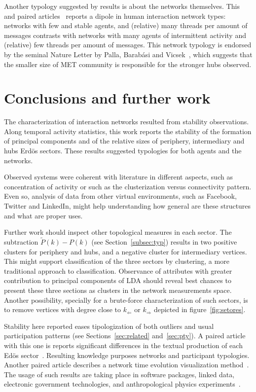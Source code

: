 \documentclass[%
 aip,
 jmp,%
 amsmath,amssymb,
 reprint,%
]{revtex4-1}
\begin{document}
Another typology suggested by results is about the networks themselves. This and paired articles~\cite{rcText,versinus} reports a dipole in human interaction network types: networks with few and stable agents, and (relative) many threads per amount of messages contrasts with networks with many agents of intermittent activity and (relative) few threads per amount of messages.
This network typology is endorsed by the seminal Nature Letter by Palla, Barab{\'a}si and Vicsek~\cite{barabasiEvo}, which suggests that the smaller size of MET community is responsible for the stronger hubs observed.

 
\section{Conclusions and further work}\label{sec:conc}
The characterization of interaction networks resulted from stability observations. Along temporal activity statistics, this work reports the stability of the formation of principal components and of the relative sizes of periphery, intermediary and hubs Erd\"os sectors. These results suggested typologies for both agents and the networks.

Observed systems were coherent with literature in different aspects, such as concentration of activity or such as the clusterization versus connectivity pattern.
Even so, analysis of data from other virtual environments, such as Facebook, Twitter and LinkedIn, might help understanding how general are these structures and what are proper uses.

Further work should inspect other topological measures in each sector.
The subtraction $\widetilde{P}(k)-P(k)$ (see Section~\ref{subsec:typ}) results in two positive clusters for periphery and hubs, and a negative cluster for intermediary vertices. This might support classification of the three sectors by clustering, a more traditional approach to classification.
Observance of attributes with greater contribution to principal components of LDA should reveal best chances to present these three sections as clusters in the network measurements space. 
Another possibility, specially for a brute-force characterization of such sectors, is to remove vertices with degree close to $k_\Leftarrow$ or $k_\Rightarrow$ depicted in figure~\ref{fig:setores}.

Stability here reported eases tipologization of both outliers and usual participation patterns (see Sections~\ref{sec:related} and~\ref{sec:pty}).
A paired article with this one is reports significant differences in the textual production of each Ed\"os sector~\cite{rcText}. Resulting knowledge purposes networks and participant typologies.
Another paired article describes a network time evolution visualization method~\cite{versinus}.
The usage of such results are taking place in software packages, linked data, electronic government technologies, and anthropological physics experiments~\cite{gmanePack,ops,opa,ensaio,anPhy}.
\end{document}
